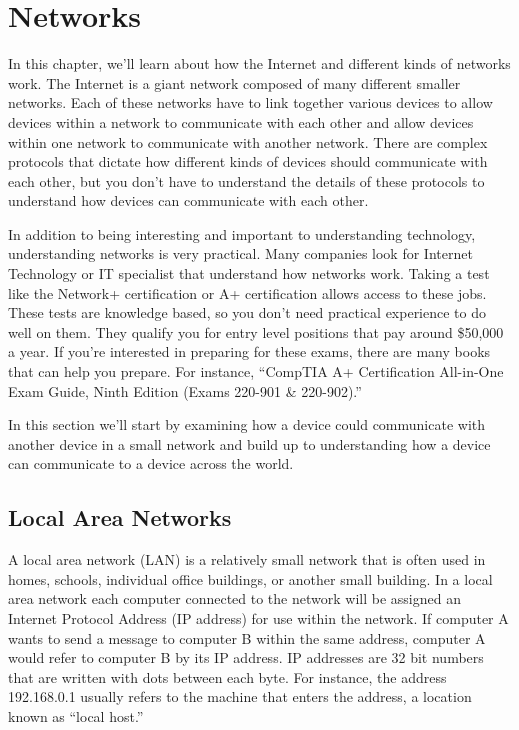 \chapter{Networks}

In this chapter, we'll learn about how the Internet and different kinds of networks work. The Internet is a giant network composed of many different smaller networks. Each of these networks have to link together various devices to allow devices within a network to communicate with each other and allow devices within one network to communicate with another network. There are complex protocols that dictate how different kinds of devices should communicate with each other, but you don’t have to understand the details of these protocols to understand how devices can communicate with each other.

In addition to being interesting and important to understanding technology, understanding networks is very practical. Many companies look for Internet Technology or IT specialist that understand how networks work. Taking a test like the Network+ certification or A+ certification allows access to these jobs. These tests are knowledge based, so you don’t need practical experience to do well on them. They qualify you for entry level positions that pay around \$50,000 a year. If you’re interested in preparing for these exams, there are many books that can help you prepare. For instance, ``CompTIA A+ Certification All-in-One Exam Guide, Ninth Edition (Exams 220-901 \& 220-902).''

In this section we'll start by examining how a device could communicate with another device in a small network and build up to understanding how a device can communicate to a device across the world.

\section{Local Area Networks}

A local area network (LAN) is a relatively small network that is often used in homes, schools, individual office buildings, or another small building. In a local area network each computer connected to the network will be assigned an Internet Protocol Address (IP address) for use within the network. If computer A wants to send a message to computer B within the same address, computer A would refer to computer B by its IP address. IP addresses are 32 bit numbers that are written with dots between each byte. For instance, the address 192.168.0.1 usually refers to the machine that enters the address, a location known as ``local host.''

